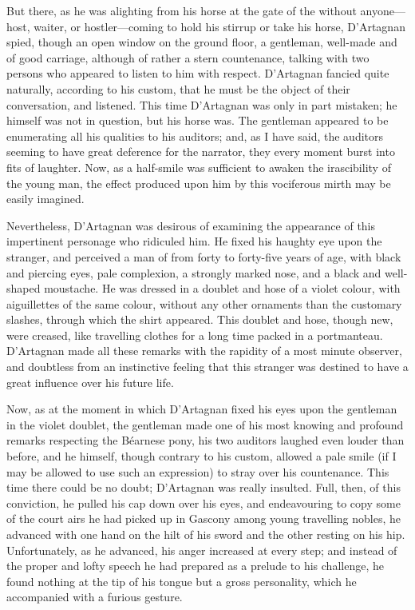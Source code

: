 But there, as he was alighting from his horse at the gate of the  without anyone—host, waiter, or hostler—coming to hold his stirrup or take his horse, D'Artagnan spied, though an open window on the ground floor, a gentleman, well-made and of good carriage, although of rather a stern countenance, talking with two persons who appeared to listen to him with respect. D'Artagnan fancied quite naturally, according to his custom, that he must be the object of their conversation, and listened. This time D'Artagnan was only in part mistaken; he himself was not in question, but his horse was. The gentleman appeared to be enumerating all his qualities to his auditors; and, as I have said, the auditors seeming to have great deference for the narrator, they every moment burst into fits of laughter. Now, as a half-smile was sufficient to awaken the irascibility of the young man, the effect produced upon him by this vociferous mirth may be easily imagined. 

Nevertheless, D'Artagnan was desirous of examining the appearance of this impertinent personage who ridiculed him. He fixed his haughty eye upon the stranger, and perceived a man of from forty to forty-five years of age, with black and piercing eyes, pale complexion, a strongly marked nose, and a black and well-shaped moustache. He was dressed in a doublet and hose of a violet colour, with aiguillettes of the same colour, without any other ornaments than the customary slashes, through which the shirt appeared. This doublet and hose, though new, were creased, like travelling clothes for a long time packed in a portmanteau. D'Artagnan made all these remarks with the rapidity of a most minute observer, and doubtless from an instinctive feeling that this stranger was destined to have a great influence over his future life. 

Now, as at the moment in which D'Artagnan fixed his eyes upon the gentleman in the violet doublet, the gentleman made one of his most knowing and profound remarks respecting the Béarnese pony, his two auditors laughed even louder than before, and he himself, though contrary to his custom, allowed a pale smile (if I may be allowed to use such an expression) to stray over his countenance. This time there could be no doubt; D'Artagnan was really insulted. Full, then, of this conviction, he pulled his cap down over his eyes, and endeavouring to copy some of the court airs he had picked up in Gascony among young travelling nobles, he advanced with one hand on the hilt of his sword and the other resting on his hip. Unfortunately, as he advanced, his anger increased at every step; and instead of the proper and lofty speech he had prepared as a prelude to his challenge, he found nothing at the tip of his tongue but a gross personality, which he accompanied with a furious gesture. 

